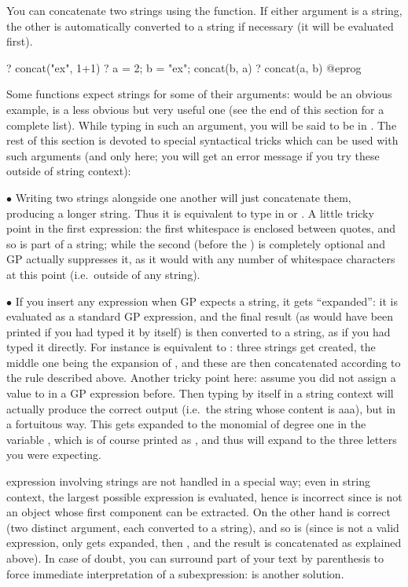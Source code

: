 You can concatenate two strings using the  function. If either
argument is a string, the other is automatically converted to a string if
necessary (it will be evaluated first).

\bprog
? concat("ex", 1+1)
? a = 2; b = "ex"; concat(b, a)
? concat(a, b)
@eprog

Some functions expect strings for some of their arguments:  would
be an obvious example,  is a less obvious but very useful one (see
the end of this section for a complete list). While typing in such an
argument, you will be said to be in . The rest of
this section is devoted to special syntactical tricks which can be used with
such arguments (and only here; you will get an error message if you try these
outside of string context):

$\bullet$ Writing two strings alongside one another will just concatenate
them, producing a longer string. Thus it is equivalent to type in
 or . A little tricky point in the first expression:
the first whitespace is enclosed between quotes, and so is part of a string;
while the second (before the ) is completely optional and GP
actually suppresses it, as it would with any number of whitespace characters
at this point (i.e.~outside of any string).

$\bullet$ If you insert any expression when GP expects a string, it gets
``expanded'': it is evaluated as a standard GP expression, and the final
result (as would have been printed if you had typed it by itself) is then
converted to a string, as if you had typed it directly. For instance  is equivalent to : three strings get created, the middle
one being the expansion of , and these are then concatenated
according to the rule described above. Another tricky point here: assume you
did not assign a value to  in a GP expression before. Then typing
 by itself in a string context will actually produce the correct
output (i.e.~the string whose content is aaa), but in a fortuitous way. This
 gets expanded to the monomial of degree one in the variable
, which is of course printed as , and thus will expand to
the three letters you were expecting.

 expression involving strings are not handled in a
special way; even in string context, the largest possible expression is
evaluated, hence  is incorrect since  is not an
object whose first component can be extracted. On the other hand
 is correct (two distinct argument, each converted to a
string), and so is  (since  is not a valid
expression, only  gets expanded, then , and the result is
concatenated as explained above). In case of doubt, you can surround part of
your text by parenthesis to force immediate interpretation of a
subexpression:  is another solution.

